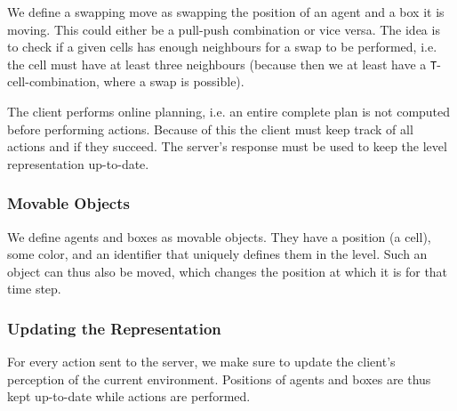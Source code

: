 We define a swapping move as swapping the position of an agent and a box it is moving.
This could either be a pull-push combination or vice versa.
The idea is to check if a given cells has enough neighbours for a swap to be performed, i.e. the cell must have at least three neighbours (because then we at least have a \texttt{T}-cell-combination, where a swap is possible).

The client performs online planning, i.e. an entire complete plan is not computed before performing actions.
Because of this the client must keep track of all actions and if they succeed.
The server's response must be used to keep the level representation up-to-date.

\subsubsection{Movable Objects}

We define agents and boxes as movable objects.
They have a position (a cell), some color, and an identifier that uniquely defines them in the level.
Such an object can thus also be moved, which changes the position at which it is for that time step.

\subsubsection{Updating the Representation}

For every action sent to the server, we make sure to update the client's perception of the current environment.
Positions of agents and boxes are thus kept up-to-date while actions are performed.

